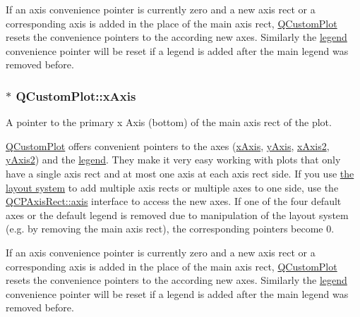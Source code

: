 If an axis convenience pointer is currently zero and a new axis rect or a corresponding axis is added in the place of the main axis rect, \hyperlink{class_q_custom_plot}{Q\+Custom\+Plot} resets the convenience pointers to the according new axes. Similarly the \hyperlink{class_q_custom_plot_a4eadcd237dc6a09938b68b16877fa6af}{legend} convenience pointer will be reset if a legend is added after the main legend was removed before. 
\subsubsection[{\texorpdfstring{x\+Axis}{xAxis}}]{ $\ast$ Q\+Custom\+Plot\+::x\+Axis}\hypertarget{class_q_custom_plot_a9a79cd0158a4c7f30cbc702f0fd800e4}{}\label{class_q_custom_plot_a9a79cd0158a4c7f30cbc702f0fd800e4}
A pointer to the primary x Axis (bottom) of the main axis rect of the plot.

\hyperlink{class_q_custom_plot}{Q\+Custom\+Plot} offers convenient pointers to the axes (\hyperlink{class_q_custom_plot_a9a79cd0158a4c7f30cbc702f0fd800e4}{x\+Axis}, \hyperlink{class_q_custom_plot_af6fea5679725b152c14facd920b19367}{y\+Axis}, \hyperlink{class_q_custom_plot_ada41599f22cad901c030f3dcbdd82fd9}{x\+Axis2}, \hyperlink{class_q_custom_plot_af13fdc5bce7d0fabd640f13ba805c0b7}{y\+Axis2}) and the \hyperlink{class_q_custom_plot_a4eadcd237dc6a09938b68b16877fa6af}{legend}. They make it very easy working with plots that only have a single axis rect and at most one axis at each axis rect side. If you use \hyperlink{}{the layout system} to add multiple axis rects or multiple axes to one side, use the \hyperlink{class_q_c_p_axis_rect_a560de44e47a4af0f86c59102a094b1e4}{Q\+C\+P\+Axis\+Rect\+::axis} interface to access the new axes. If one of the four default axes or the default legend is removed due to manipulation of the layout system (e.\+g. by removing the main axis rect), the corresponding pointers become 0.

If an axis convenience pointer is currently zero and a new axis rect or a corresponding axis is added in the place of the main axis rect, \hyperlink{class_q_custom_plot}{Q\+Custom\+Plot} resets the convenience pointers to the according new axes. Similarly the \hyperlink{class_q_custom_plot_a4eadcd237dc6a09938b68b16877fa6af}{legend} convenience pointer will be reset if a legend is added after the main legend was removed before. 

